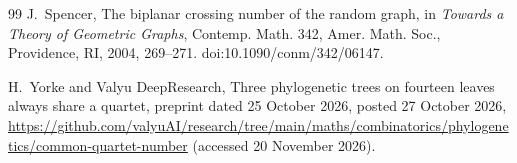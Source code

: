 \documentclass[11pt]{amsart}
\theoremstyle{definition}
\begin{document}
\begin{thebibliography}{99}
 J.~Spencer, The biplanar crossing number of the random graph, in \emph{Towards a Theory of
Geometric Graphs}, Contemp. Math. 342, Amer. Math. Soc., Providence, RI, 2004, 269--271.
doi:10.1090/conm/342/06147.

 H.~Yorke and Valyu DeepResearch, Three phylogenetic trees on fourteen leaves always share a quartet,
preprint dated 25 October 2026, posted 27 October 2026,
\url{https://github.com/valyuAI/research/tree/main/maths/combinatorics/phylogenetics/common-quartet-number}
(accessed 20 November 2026).

\end{thebibliography}
\end{document}
